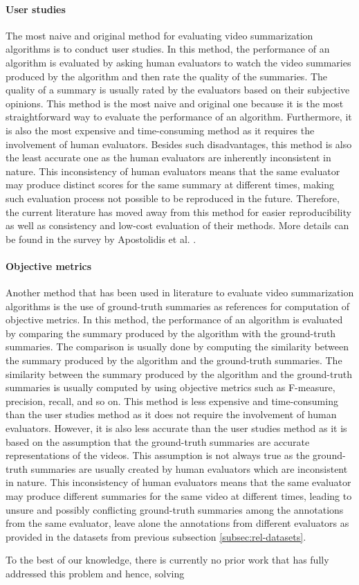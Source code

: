 		\paragraph[short]{User studies}
			The most naive and original method for evaluating video summarization algorithms is to conduct user studies. In this method, the performance of an algorithm is evaluated by asking human evaluators to watch the video summaries produced by the algorithm and then rate the quality of the summaries. The quality of a summary is usually rated by the evaluators based on their subjective opinions. This method is the most naive and original one because it is the most straightforward way to evaluate the performance of an algorithm. Furthermore, it is also the most expensive and time-consuming method as it requires the involvement of human evaluators. Besides such disadvantages, this method is also the least accurate one as the human evaluators are inherently inconsistent in nature. This inconsistency of human evaluators means that the same evaluator may produce distinct scores for the same summary at different times, making such evaluation process not possible to be reproduced in the future. Therefore, the current literature has moved away from this method for easier reproducibility as well as consistency and low-cost evaluation of their methods. More details can be found in the survey by Apostolidis et al. \cite{Apostolidis2021Video}.

		\paragraph[short]{Objective metrics}
			Another method that has been used in literature to evaluate video summarization algorithms is the use of ground-truth summaries as references for computation of objective metrics. In this method, the performance of an algorithm is evaluated by comparing the summary produced by the algorithm with the ground-truth summaries. The comparison is usually done by computing the similarity between the summary produced by the algorithm and the ground-truth summaries. The similarity between the summary produced by the algorithm and the ground-truth summaries is usually computed by using objective metrics such as F-measure, precision, recall, and so on. This method is less expensive and time-consuming than the user studies method as it does not require the involvement of human evaluators. However, it is also less accurate than the user studies method as it is based on the assumption that the ground-truth summaries are accurate representations of the videos. This assumption is not always true as the ground-truth summaries are usually created by human evaluators which are inconsistent in nature. This inconsistency of human evaluators means that the same evaluator may produce different summaries for the same video at different times, leading to unsure and possibly conflicting ground-truth summaries among the annotations from the same evaluator, leave alone the annotations from different evaluators as provided in the datasets from previous subsection \ref{subsec:rel-datasets}.

		
		To the best of our knowledge, there is currently no prior work that has fully addressed this problem and hence, solving